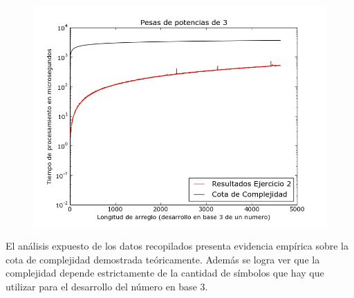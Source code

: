     \renewcommand\constante{5}

	\begin{figure}[H]
      \begin{center}
        \includegraphics[width=0.7\columnwidth]{imagenes/ej2Nuevo.jpeg}
        \caption{}
      \end{center}
  \end{figure}

El análisis expuesto de los datos recopilados presenta evidencia empírica sobre la cota de complejidad
demostrada teóricamente. Además se logra ver que la complejidad depende estrictamente de la cantidad
de símbolos que hay que utilizar para el desarrollo del número en base 3.